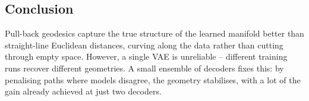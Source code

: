 \subsection*{Conclusion}

Pull-back geodesics capture the true structure of the learned manifold better than straight-line Euclidean distances, curving along the data rather than cutting through empty space. However, a single VAE is unreliable -- different training runs recover different geometries. A small ensemble of decoders fixes this: by penalising paths where models disagree, the geometry stabilises, with a lot of the gain already achieved at just two decoders.